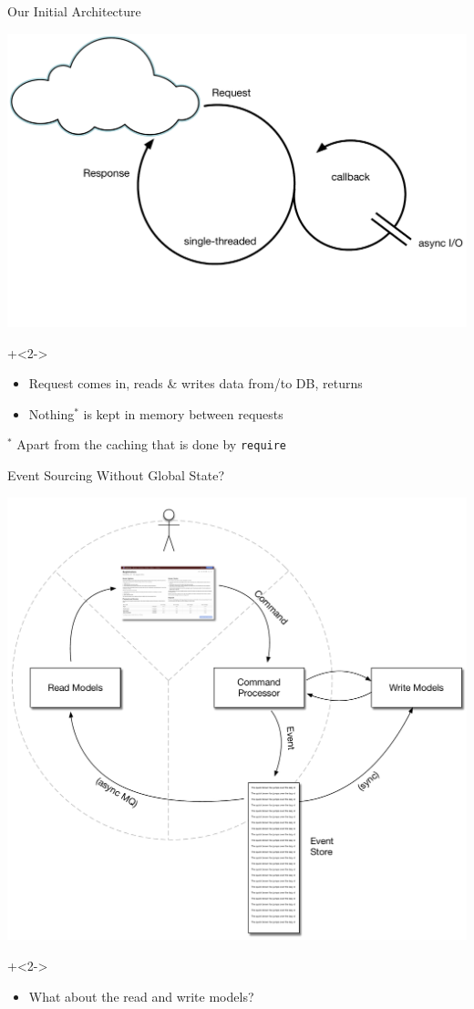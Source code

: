 \begin{frame}[fragile]{Our Initial Architecture}

\includegraphics[width=.7\textwidth]{../Nodejs3.pdf}

\onslide+<2->

\begin{itemize}
\item Request comes in, reads \& writes data from/to DB, returns
\item Nothing$^*$ is kept in memory between requests
\end{itemize}

{ \tiny $^*$ Apart from the caching that is done by \texttt{require} }
\end{frame}

\begin{frame}[fragile]{Event Sourcing Without Global State?}

\includegraphics[width=.5\textwidth]{../EventSourcing4.pdf}

\onslide+<2->

\begin{itemize}
\item What about the read and write models?
\end{itemize}

\end{frame}

